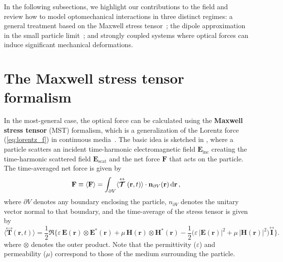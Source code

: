  In the following subsections, we highlight our contributions to the field and review how to model optomechanical interactions in three distinct regimes: a general treatment based on the Maxwell stress tensor~\cite{ownpub2}; 
 the dipole approximation in the small particle limit~\cite{ownpub1, ownpub3}; and strongly coupled systems where optical forces can induce significant mechanical deformations.
\section{The Maxwell stress tensor formalism~\cite{ownpub2}}\label{sec:engi}

In the most-general case, the optical force can be calculated using the \textbf{Maxwell stress tensor} (MST) formalism, which is a generalization of the Lorentz force (\eqref{eq:lorentz_f}) in continuous media~\cite{novotny}.
The basic idea is sketched in , where
a particle scatters an incident time-harmonic electromagnetic field $\mathbf{E}_\text{inc}$ creating the time-harmonic scattered field $\mathbf{E}_\text{scat}$ and the net force $\mathbf{F}$ that acts
on the particle. The time-averaged net force is given by~\cite{novotny}
\begin{equation}\label{eq:f_MST}
    \mathbf{F} \equiv \langle\mathbf{F}\rangle=\int_{\partial V}\langle\stackrel{\leftrightarrow}{\bm{\mathcal{T}}}(\mathbf{r}, t)\rangle \cdot \mathbf{n}_{\partial V}(\mathbf{r}) \mathop{}\!\text{d} \mathbf{r}\,,
\end{equation}
where $\partial V$ denotes any boundary enclosing the particle, $n_{\partial V}$ denotes the unitary vector normal to that boundary, and
the time-average of the stress tensor is given by
\begin{equation}
        \langle \stackrel{\leftrightarrow}{\mathbf{T}}(\mathbf{r}, t) \rangle 
        = \frac{1}{2} \Re \Big\{ 
            \varepsilon\, \mathbf{E}(\mathbf{r}) \otimes \mathbf{E}^*(\mathbf{r})
            + \mu\, \mathbf{H}(\mathbf{r}) \otimes \mathbf{H}^*(\mathbf{r})
         - \frac{1}{2} \big( \varepsilon\, |\mathbf{E}(\mathbf{r})|^2 + \mu\, |\mathbf{H}(\mathbf{r})|^2 \big) 
        \stackrel{\leftrightarrow}{\mathbf{I}} \Big\}.
\end{equation}
where $\otimes$ denotes the outer product. Note that the permittivity ($\varepsilon$) and permeability ($\mu$) correspond to those of the medium surrounding the particle.

